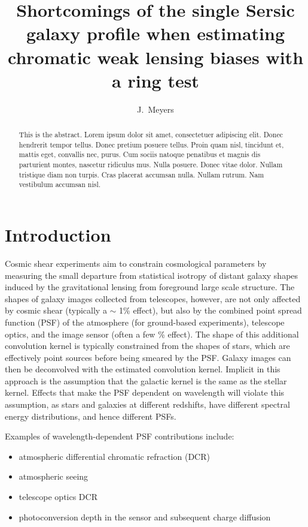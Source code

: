 \documentclass[apj]{emulateapj}
\begin{document}
\title{Shortcomings of the single Sersic galaxy profile when estimating chromatic weak lensing biases with a ring test}

\author{
J.~Meyers}


\begin{abstract}
This is the abstract.  Lorem ipsum dolor sit amet, consectetuer adipiscing elit. Donec hendrerit tempor tellus. Donec pretium posuere tellus. Proin quam nisl, tincidunt et, mattis eget, convallis nec, purus. Cum sociis natoque penatibus et magnis dis parturient montes, nascetur ridiculus mus. Nulla posuere. Donec vitae dolor. Nullam tristique diam non turpis. Cras placerat accumsan nulla. Nullam rutrum. Nam vestibulum accumsan nisl.
\end{abstract}

\section{Introduction}\label{sec:intro}
Cosmic shear experiments aim to constrain cosmological parameters by
measuring the small departure from statistical isotropy of distant
galaxy shapes induced by the gravitational lensing from foreground
large scale structure.  The shapes of galaxy images collected from
telescopes, however, are not only affected by cosmic shear (typically
a $\sim$ 1\% effect), but also by the combined point spread function
(PSF) of the atmosphere (for ground-based experiments), telescope
optics, and the image sensor (often a few \% effect).  The shape of
this additional convolution kernel is typically constrained from the
shapes of stars, which are effectively point sources before being
smeared by the PSF.  Galaxy images can then be deconvolved with the
estimated convolution kernel.  Implicit in this approach is the
assumption that the galactic kernel is the same as the stellar kernel.
Effects that make the PSF dependent on wavelength will violate this
assumption, as stars and galaxies at different redshifts, have
different spectral energy distributions, and hence different PSFs.

Examples of wavelength-dependent PSF contributions include:

\begin{itemize}
  \item atmospheric differential chromatic refraction (DCR)
  \item atmospheric seeing
  \item telescope optics DCR
  \item photoconversion depth in the sensor and subsequent charge diffusion
\end{itemize}
\end{document}
